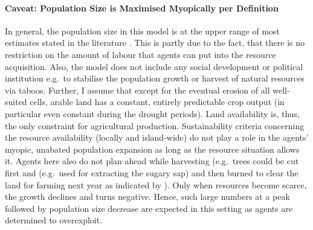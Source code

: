 \paragraph{Caveat: Population Size is Maximised Myopically per Definition}
In general, the population size in this model is at the upper range of most estimates stated in the literature \citep{Bahn2017}.
This is partly due to the fact, that there is no restriction on the amount of labour that agents can put into the resource acquisition. 
Also, the model does not include any social development or political institution e.g.\ to stabilise the population growth or harvest of natural resources via taboos.
Further, I assume that except for the eventual erosion of all well-suited cells, arable land has a constant, entirely predictable crop output (in particular even constant during the drought periods). 
Land availability is, thus, the only constraint for agricultural production. 
Sustainability criteria concerning the resource availability (locally and island-wide) do not play a role in the agents' myopic, unabated population expansion as long as the resource situation allows it.
Agents here also do not plan ahead while harvesting (e.g.\ trees could be cut first and (e.g.\ used for extracting the sugary sap) and then burned to clear the land for farming next year as indicated by \citet{Mieth2015}).
Only when resources become scarce, the growth declines and turns negative.
Hence, such large numbers at a peak followed by population size decrease are expected in this setting as agents are determined to overexploit.


